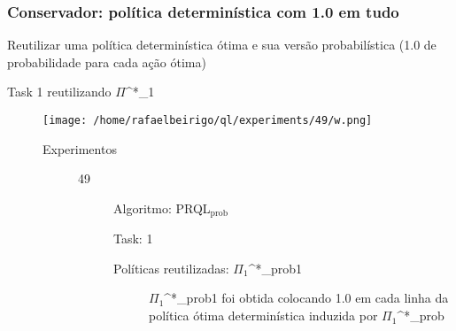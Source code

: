 \documentclass[11pt]{article}
\begin{document}
\subsubsection{Conservador: política determinística com 1.0 em tudo}
\label{sec-11.1.1}

Reutilizar uma política determinística ótima e sua versão probabilística (1.0 de probabilidade para cada ação ótima)

\begin{description}

\item[Task 1 reutilizando $\Pi$^*_1]\label{sec-11.1.1.1}


\centerline{\texttt{[image: /home/rafaelbeirigo/ql/experiments/49/w.png]}}


\begin{description}

\item[Experimentos]\label{sec-11.1.1.1.1}


\begin{description}

\item[49]\label{sec-11.1.1.1.1.1}


\begin{description}

\item[Algoritmo: PRQL$_{\mathrm{prob}}$]\label{sec-11.1.1.1.1.1.1}


\end{description}
\begin{description}

\item[Task: 1]\label{sec-11.1.1.1.1.1.2}


\end{description}
\begin{description}

\item[Políticas reutilizadas: $\Pi$$_1$^*_prob1]\label{sec-11.1.1.1.1.1.3}


\begin{description}

\item[$\Pi$$_1$^*_prob1 foi obtida colocando 1.0 em cada linha da política ótima determinística induzida por $\Pi$$_1$^*_prob]\label{sec-11.1.1.1.1.1.3.1}


\end{description}
\end{description}
\begin{description}


\end{description}
\end{description}
\end{description}
\end{description}
\end{document}
